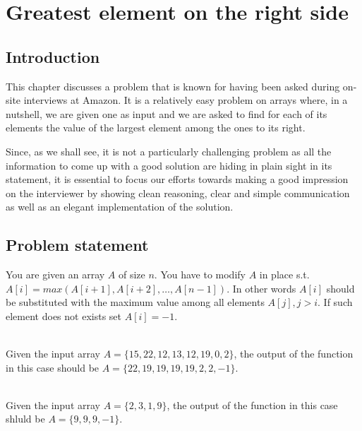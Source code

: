 %


\chapter{Greatest element on the right side}
\label{ch:greatest_right}
\section*{Introduction}

This chapter discusses a problem that is known for having been asked during on-site interviews at Amazon. 
It is a relatively easy problem on arrays where, in a nutshell, we are given one as input and we are asked to find for each of its elements the value of the largest element among the ones to its right. 

Since, as we shall see, it is not a particularly challenging problem as all the information to come up with a good solution are hiding in plain sight in its statement, it is essential to focus our efforts towards making a good impression on the interviewer by showing clean reasoning, clear and simple communication as well as an elegant implementation of the solution.

\section{Problem statement}
\begin{exercise}
You are given an array $A$ of size $n$. You have to modify $A$ in place s.t. $A[i] = max(A[i+1], A[i+2],\ldots, A[n-1])$. In other words $A[i]$ should be substituted with  the maximum value among all elements $A[j], j > i$. If such element does not exists set $A[i] = -1$.

	\begin{example}
		\hfill \\
		Given the input array $A = \{15, 22, 12, 13, 12, 19, 0, 2\}$, the output of the function in this case should be  $A = \{22, 19, 19, 19, 19, 2, 2, -1\}$.
	\end{example}

	\begin{example}
		\hfill \\
		Given the input array $A = \{2, 3, 1, 9\}$, the output of the function in this case shluld be  $A = \{9, 9, 9, -1\}$.
	\end{example}

\end{exercise}


